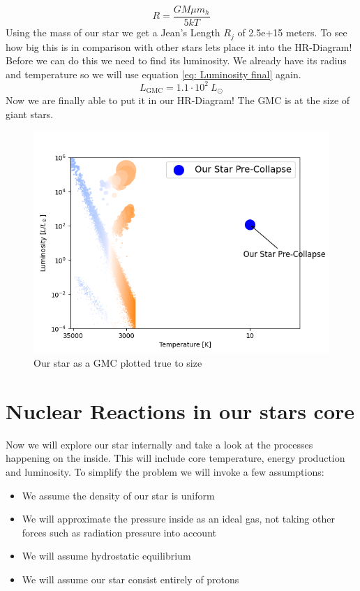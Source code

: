 \documentclass[reprint,english,notitlepage]{revtex4-2}
\begin{document}
\begin{equation}\label{eq: Jeans length}
  R = \frac{GMμ m_h }{5kT} 
\end{equation}
Using the mass of our star we get a Jean's Length $ R_j $ of 2.5e+15 meters. To see how big this is in comparison with other stars lets place it into the HR-Diagram! Before we can do this we need to find its luminosity. We already have its radius and temperature so we will use equation \ref{eq: Luminosity final} again. 
\begin{equation}
  L_{\text{GMC}} = 1.1 ⋅ 10^{2}\ L_{⊙}
\end{equation}
Now we are finally able to put it in our HR-Diagram! The GMC is at the size of giant stars. 
\begin{figure}[h!]
  \centering
  \includegraphics[scale = .5]{figures/HR_diagram_Pre-Collapse}
  \caption{Our star as a GMC plotted true to size}
  \label{fig:figure1}
\end{figure}

\section{Nuclear Reactions in our stars core}
Now we will explore our star internally and take a look at the processes happening on the inside. This will include core temperature, energy production and luminosity. To simplify the problem we will invoke a few assumptions: 
\begin{itemize}
  \item We assume the density of our star is uniform
  \item We will approximate the pressure inside as an ideal gas, not taking other forces such as radiation pressure into account
  \item We will assume hydrostatic equilibrium
  \item We will assume our star consist entirely of protons 
\end{itemize}
\end{document}
